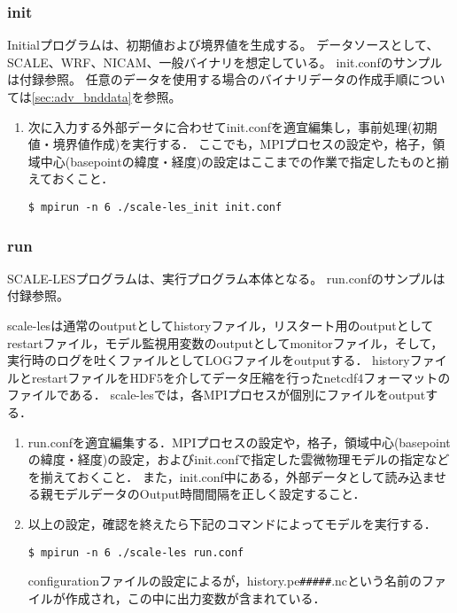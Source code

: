 \subsubsection{init}

Initialプログラムは、初期値および境界値を生成する。
データソースとして、SCALE、WRF、NICAM、一般バイナリを想定している。
init.confのサンプルは付録参照。
任意のデータを使用する場合のバイナリデータの作成手順については\ref{sec:adv_bnddata}を参照。

\begin{enumerate}
\item 次に入力する外部データに合わせてinit.confを適宜編集し，事前処理(初期値・境界値作成)を実行する．
ここでも，MPIプロセスの設定や，格子，領域中心(basepointの緯度・経度)の設定はここまでの作業で指定したものと揃えておくこと．
\begin{verbatim}
$ mpirun -n 6 ./scale-les_init init.conf
\end{verbatim}
\end{enumerate}



\subsubsection{run}
SCALE-LESプログラムは、実行プログラム本体となる。
run.confのサンプルは付録参照。

scale-lesは通常のoutputとしてhistoryファイル，リスタート用のoutputとしてrestartファイル，モデル監視用変数のoutputとしてmonitorファイル，そして，実行時のログを吐くファイルとしてLOGファイルをoutputする．
historyファイルとrestartファイルをHDF5を介してデータ圧縮を行ったnetcdf4フォーマットのファイルである．
scale-lesでは，各MPIプロセスが個別にファイルをoutputする．


\begin{enumerate}
\item run.confを適宜編集する．MPIプロセスの設定や，格子，領域中心(basepointの緯度・経度)の設定，およびinit.confで指定した雲微物理モデルの指定などを揃えておくこと．
また，init.conf中にある，外部データとして読み込ませる親モデルデータのOutput時間間隔を正しく設定すること．

\item 以上の設定，確認を終えたら下記のコマンドによってモデルを実行する．
\begin{verbatim}
$ mpirun -n 6 ./scale-les run.conf
\end{verbatim}
configurationファイルの設定によるが，history.pe\verb|#####|.ncという名前のファイルが作成され，この中に出力変数が含まれている．
\end{enumerate}



